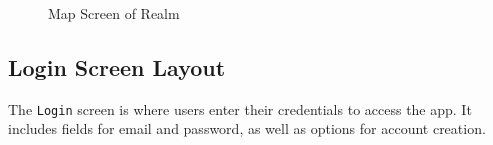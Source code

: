 \documentclass[12pt, titlepage]{article}
\newcommand{\progname}{Realm}
\begin{document}
\begin{figure}[ht!]
    \setlength{\fboxrule}{0.1mm}
    \centering
    \caption{Map Screen of \progname{}}
    \label{fig:maps}
\end{figure}

\subsection{Login Screen Layout}
The \texttt{Login} screen is where users enter their credentials to access the app. It includes fields for email and password, as well as options for account creation.
\end{document}
